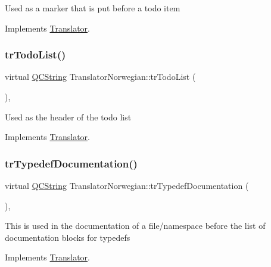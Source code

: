 Used as a marker that is put before a todo item 

Implements \mbox{\hyperlink{class_translator}{Translator}}.

\mbox{\label{class_translator_norwegian_a054e211de282ce9201cdceac355a0995}} 
\subsubsection{\texorpdfstring{trTodoList()}{trTodoList()}}
{\footnotesize\ttfamily virtual \mbox{\hyperlink{class_q_c_string}{Q\+C\+String}} Translator\+Norwegian\+::tr\+Todo\+List (\begin{DoxyParamCaption}{ }\end{DoxyParamCaption})\hspace{0.3cm}{\ttfamily [inline]}, {\ttfamily [virtual]}}

Used as the header of the todo list 

Implements \mbox{\hyperlink{class_translator}{Translator}}.

\mbox{\label{class_translator_norwegian_ac018e7af9b956f72f75b84c51821ae4a}} 
\subsubsection{\texorpdfstring{trTypedefDocumentation()}{trTypedefDocumentation()}}
{\footnotesize\ttfamily virtual \mbox{\hyperlink{class_q_c_string}{Q\+C\+String}} Translator\+Norwegian\+::tr\+Typedef\+Documentation (\begin{DoxyParamCaption}{ }\end{DoxyParamCaption})\hspace{0.3cm}{\ttfamily [inline]}, {\ttfamily [virtual]}}

This is used in the documentation of a file/namespace before the list of documentation blocks for typedefs 

Implements \mbox{\hyperlink{class_translator}{Translator}}.

\mbox{\label{class_translator_norwegian_a29f0d7815f5545b1acfad460aa478cf2}} 
